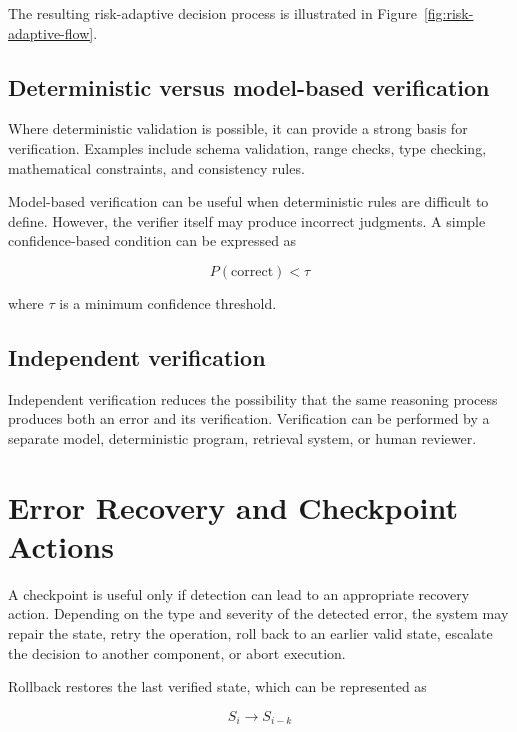 \documentclass[12pt]{article}
\begin{document}
The resulting risk-adaptive decision process is illustrated in
Figure~\ref{fig:risk-adaptive-flow}.

\subsection{Deterministic versus model-based verification}
\label{sec:deterministic-model-verification}

Where deterministic validation is possible, it can provide a strong basis for
verification. Examples include schema validation, range checks, type checking,
mathematical constraints, and consistency rules.

Model-based verification can be useful when deterministic rules are difficult
to define. However, the verifier itself may produce incorrect judgments. A
simple confidence-based condition can be expressed as

\begin{equation}
P(\text{correct})<\tau
\label{eq:confidence-threshold}
\end{equation}

where $\tau$ is a minimum confidence threshold.

\subsection{Independent verification}
\label{sec:independent-verification}

Independent verification reduces the possibility that the same reasoning
process produces both an error and its verification. Verification can be
performed by a separate model, deterministic program, retrieval system, or
human reviewer.

\section{Error Recovery and Checkpoint Actions}
\label{sec:error-recovery}

A checkpoint is useful only if detection can lead to an appropriate recovery
action. Depending on the type and severity of the detected error, the system
may repair the state, retry the operation, roll back to an earlier valid
state, escalate the decision to another component, or abort execution.

Rollback restores the last verified state, which can be represented as

\begin{equation}
S_i \rightarrow S_{i-k}
\label{eq:rollback}
\end{equation}
\end{document}
